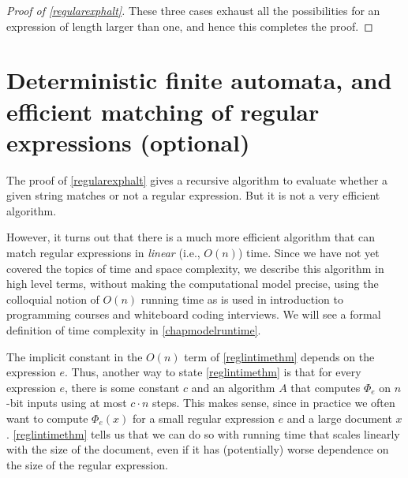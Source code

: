 \begin{proof}[Proof of \cref{regularexphalt}]
These three cases exhaust all the possibilities for an expression of
length larger than one, and hence this completes the proof.

\end{proof}

\section{Deterministic finite automata, and efficient matching of
regular expressions (optional)}\label{Deterministic-finite-auto}

The proof of \cref{regularexphalt} gives a recursive algorithm to
evaluate whether a given string matches or not a regular expression. But
it is not a very efficient algorithm.

However, it turns out that there is a much more efficient algorithm that
can match regular expressions in \emph{linear} (i.e., \(O(n)\)) time.
Since we have not yet covered the topics of time and space complexity,
we describe this algorithm in high level terms, without making the
computational model precise, using the colloquial notion of \(O(n)\)
running time as is used in introduction to programming courses and
whiteboard coding interviews. We will see a formal definition of time
complexity in \cref{chapmodelruntime}.

\hypertarget{reglintimethm}{}

The implicit constant in the \(O(n)\) term of \cref{reglintimethm}
depends on the expression \(e\). Thus, another way to state
\cref{reglintimethm} is that for every expression \(e\), there is some
constant \(c\) and an algorithm \(A\) that computes \(\Phi_e\) on
\(n\)-bit inputs using at most \(c\cdot n\) steps. This makes sense,
since in practice we often want to compute \(\Phi_e(x)\) for a small
regular expression \(e\) and a large document \(x\).
\cref{reglintimethm} tells us that we can do so with running time that
scales linearly with the size of the document, even if it has
(potentially) worse dependence on the size of the regular expression.


